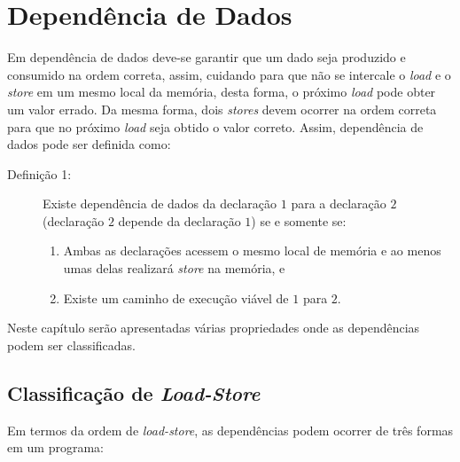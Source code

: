 \section{Dependência de Dados}

Em dependência de dados deve-se garantir que um dado seja produzido e consumido
na ordem correta, assim, cuidando para que não se intercale o \textit{load} e o
\textit{store} em um mesmo local da memória, desta forma, o próximo
\textit{load} pode obter um valor errado. 
Da mesma forma, dois \textit{stores} devem ocorrer na ordem correta para 
que no próximo \textit{load} seja obtido o valor correto.
Assim, dependência de dados pode ser definida como:

\begin{description}
        \item [Definição 1:] Existe dependência de dados da declaração $1$ para a declaração 
        $2$ (declaração $2$ depende da declaração $1$) se e somente se:
\begin{enumerate}
        \item Ambas as declarações acessem o mesmo local de memória e ao menos
                umas delas realizará \textit{store} na memória, e
        \item Existe um caminho de execução viável de $1$ para $2$.
\end{enumerate}
\end{description}

Neste capítulo serão apresentadas várias propriedades onde as dependências 
podem ser classificadas.


\subsection{Classificação de \textit{Load-Store}}

Em termos da ordem de \textit{load-store}, as dependências podem ocorrer de 
três formas em um programa:

